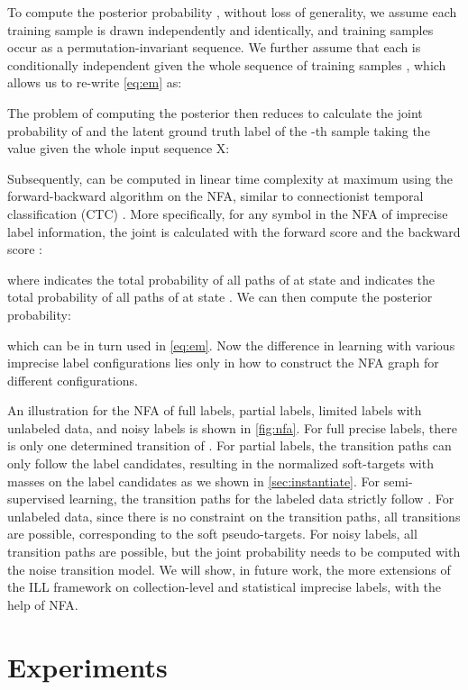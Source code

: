 To compute the posterior probability , 
without loss of generality, we assume each training sample is drawn independently and identically, and training samples occur as a permutation-invariant sequence.
We further assume that each  is conditionally independent given the whole sequence of training samples , which allows us to re-write
\cref{eq:em} as:

The problem of computing the posterior then reduces to calculate the joint probability of  and the latent ground truth label of the -th sample taking the value  given the whole input sequence X:




Subsequently,  can be computed in linear time complexity  at maximum using the forward-backward algorithm on the NFA, similar to connectionist temporal classification (CTC) \citep{graves2006ctc}. 
More specifically, for any symbol  in the NFA of imprecise label information, the joint is calculated with the forward score  and the backward score :

where  indicates the total probability of all paths of  at state  and  indicates the total probability of all paths of  at state . 
We can then compute the posterior probability:

which can be in turn used in \cref{eq:em}. 
Now the difference in learning with various imprecise label configurations lies only in how to construct the NFA graph for different configurations.

An illustration for the NFA of full labels, partial labels, limited labels with unlabeled data, and noisy labels is shown in \cref{fig:nfa}. For full precise labels, there is only one determined transition of . For partial labels, the transition paths can only follow the label candidates, resulting in the normalized soft-targets with masses on the label candidates as we shown in \cref{sec:instantiate}. For semi-supervised learning, the transition paths for the labeled data strictly follow . For unlabeled data, since there is no constraint on the transition paths, all transitions are possible, corresponding to the soft pseudo-targets. 
For noisy labels, all transition paths are possible, but the joint probability needs to be computed with the noise transition model. 
We will show, in future work, the more extensions of the ILL framework on collection-level and statistical imprecise labels, with the help of NFA. 





\section{Experiments}
\label{sec:appen-exp}

